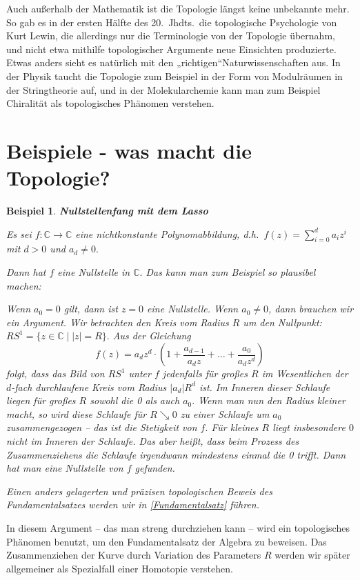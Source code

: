 \documentclass[12pt]{scrbook}   %
\newtheorem{bsp}[alles]{Beispiel}
\begin{document}
Auch außerhalb der Mathematik ist die Topologie längst keine unbekannte
mehr. So gab es in der ersten Hälfte des 20.\ Jhdts.\ die topologische 
Psychologie von Kurt Lewin, die allerdings nur die Terminologie von der 
Topologie übernahm, und nicht etwa mithilfe topologischer Argumente neue
Einsichten produzierte. Etwas anders sieht es natürlich mit den 
„richtigen“Naturwissenschaften aus. In der Physik taucht
die Topologie zum Beispiel in der Form von Modulräumen in der Stringtheorie 
auf, und in der Molekularchemie kann man zum Beispiel Chiralität als
topologisches Phänomen verstehen.



\section{Beispiele - was macht die Topologie?}

\begin{bsp} \label{Lasso}{\bf Nullstellenfang mit dem Lasso}

{\rm Es sei $f:\mathbb C\longrightarrow \mathbb C$ eine nichtkonstante 
Polynomabbildung, d.h.\ $f(z) = \sum_{i=0}^d a_iz^i$ mit $d>0$ und $a_d\neq 0.$

Dann hat $f$ eine Nullstelle in $\mathbb C.$ Das kann man zum Beispiel so 
plausibel machen:

Wenn $a_0=0$ gilt, dann ist $z=0$ eine Nullstelle. Wenn $a_0\neq 0$, dann 
brauchen wir ein Argument. Wir betrachten den Kreis vom Radius $R$ um den 
Nullpunkt: $RS^1 = \{z\in \mathbb C \mid |z|=R\}.$ Aus der Gleichung
$$f(z) = a_dz^d \cdot (1 + \frac{a_{d-1}}{a_d z} + \dots + 
\frac{a_{0}}{a_d z^d})$$ 
folgt, dass das Bild von $RS^1$ unter $f$ jedenfalls für großes $R$ im 
Wesentlichen der $d$-fach 
durchlaufene Kreis vom Radius $|a_d|R^d$ ist. Im Inneren dieser Schlaufe liegen
für großes $R$ sowohl die 0 als auch $a_0.$ Wenn man nun den Radius 
kleiner macht, so wird diese Schlaufe für $R\searrow 0$ zu einer Schlaufe um 
$a_0$
zusammengezogen -- das ist die Stetigkeit von $f.$ Für kleines $R$ liegt 
insbesondere $0$ nicht im Inneren der Schlaufe. Das aber heißt, dass beim
Prozess des Zusammenziehens die Schlaufe irgendwann mindestens einmal die 0
trifft. Dann hat man eine Nullstelle von $f$ gefunden.

Einen anders gelagerten und präzisen topologischen Beweis des 
Fundamentalsatzes werden wir in \ref{Fundamentalsatz} führen.
}
\end{bsp}

In diesem Argument -- das man streng durchziehen kann -- wird ein topologisches
Phänomen benutzt, um den Fundamentalsatz der Algebra zu beweisen. Das 
Zusammenziehen der Kurve durch Variation des Parameters $R$ werden wir später
allgemeiner als Spezialfall einer Homotopie verstehen.
\end{document}
